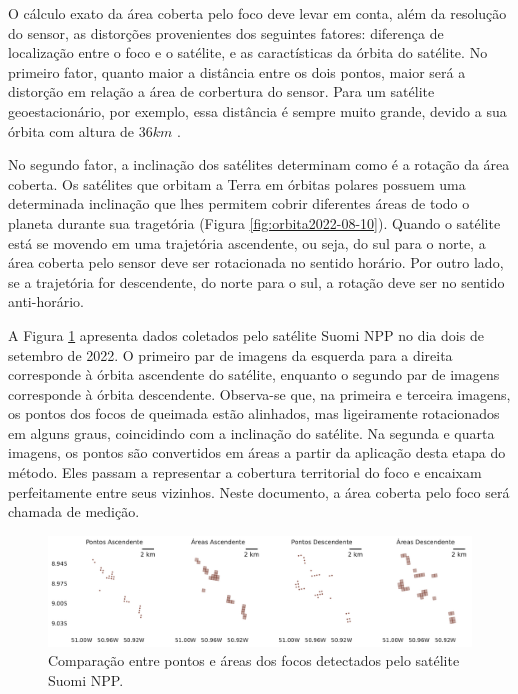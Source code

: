 \documentclass[cic,tc]{iiufrgs}
\begin{document}
O cálculo exato da área coberta pelo foco deve levar em conta, além da resolução do sensor, as distorções provenientes dos seguintes fatores: diferença de localização entre o foco e o satélite, e as caractísticas da órbita do satélite. No primeiro fator, quanto maior a distância entre os dois pontos, maior será a distorção em relação a área de corbertura do sensor. Para um satélite geoestacionário, por exemplo, essa distância é sempre muito grande, devido a sua órbita com altura de $36 km$ \citep{EmbrapaSatelites}.

No segundo fator, a inclinação dos satélites determinam como é a rotação da área coberta. Os satélites que orbitam a Terra em órbitas polares possuem uma determinada inclinação que lhes permitem cobrir diferentes áreas de todo o planeta durante sua tragetória (Figura \ref{fig:orbita2022-08-10}). Quando o satélite está se movendo em uma trajetória ascendente, ou seja, do sul para o norte, a área coberta pelo sensor deve ser rotacionada no sentido horário. Por outro lado, se a trajetória for descendente, do norte para o sul, a rotação deve ser no sentido anti-horário.

A Figura \ref{fig:comparacao_pontos_e_areas} apresenta dados coletados pelo satélite Suomi NPP no dia dois de setembro de 2022. O primeiro par de imagens da esquerda para a direita corresponde à órbita ascendente do satélite, enquanto o segundo par de imagens corresponde à órbita descendente. Observa-se que, na primeira e terceira imagens, os pontos dos focos de queimada estão alinhados, mas ligeiramente rotacionados em alguns graus, coincidindo com a inclinação do satélite. Na segunda e quarta imagens, os pontos são convertidos em áreas a partir da aplicação desta etapa do método. Eles passam a representar a cobertura territorial do foco e encaixam perfeitamente entre seus vizinhos. Neste documento, a área coberta pelo foco será chamada de medição.

\begin{figure}[!htb]
    \caption{Comparação entre pontos e áreas dos focos detectados pelo satélite Suomi NPP.}
    \begin{center}
        \includegraphics[width=35em]{comparacao_pontos_e_areas}
    \end{center}
    \label{fig:comparacao_pontos_e_areas}
\end{figure}
\end{document}
